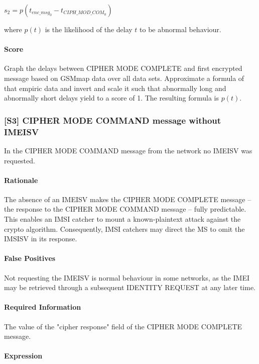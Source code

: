 \documentclass[a4paper,11pt,notitlepage,bigheadings,oneside]{scrartcl}
\begin{document}
$s_2 = p(t_{enc\_msg_0} - t_{CIPH\_MOD\_COM_0})$

where $p(t)$ is the likelihood of the delay $t$ to be abnormal behaviour.

\paragraph{Score}

\TBD{} Graph the delays between CIPHER MODE COMPLETE and first encrypted
message based on GSMmap data over all data sets. Approximate a formula of that
empiric data and invert and scale it such that abnormally long and abnormally
short delays yield to a score of 1. The resulting formula is $p(t)$.

\subsubsection{[S3] CIPHER MODE COMMAND message without IMEISV}

In the CIPHER MODE COMMAND message from the network no IMEISV was requested.

\paragraph{Rationale}

The absence of an IMEISV makes the CIPHER MODE COMPLETE message -- the response
to the CIPHER MODE COMMAND message -- fully predictable. This enables an IMSI
catcher to mount a known-plaintext attack against the crypto algorithm.
Consequently, IMSI catchers may direct the MS to omit the IMSISV in its
response.

\paragraph{False Positives}

Not requesting the IMEISV is normal behaviour in some networks, as the IMEI may
be retrieved through a subsequent IDENTITY REQUEST at any later time.

\paragraph{Required Information}

The value of the "cipher response" field of the CIPHER MODE COMPLETE message.

\paragraph{Expression}
\end{document}
